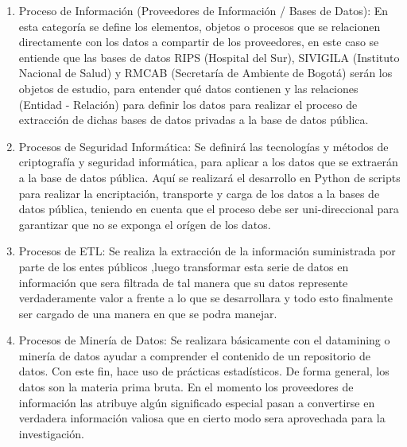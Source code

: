 \documentclass[a4paper, 11pt, oneside]{article}
\theoremstyle{definition}
\theoremstyle{remark}
\begin{document}
\begin{enumerate}[I]
\begin{enumerate}[1.]
\item{Proceso de Información (Proveedores de Información / Bases de Datos): En esta categoría se define los elementos, objetos o procesos que se relacionen directamente con los datos a compartir de los proveedores, en este caso se entiende que las bases de datos RIPS (Hospital del Sur), SIVIGILA (Instituto Nacional de Salud) y RMCAB (Secretaría de Ambiente de Bogotá) serán los objetos de estudio, para entender qué datos contienen y las relaciones (Entidad - Relación) para definir los datos para realizar el proceso de extracción de dichas bases de datos privadas a la base de datos pública.}
\item{Procesos de Seguridad Informática: Se definirá las tecnologías y métodos de criptografía y seguridad informática, para aplicar a los datos que se extraerán a la base de datos pública. Aquí se realizará el desarrollo en Python de scripts para realizar la encriptación, transporte y carga de los datos a la bases de datos pública, teniendo en cuenta que el proceso debe ser uni-direccional para garantizar que no se exponga el orígen de los datos.}
\item{Procesos de ETL: Se realiza la extracción de la información suministrada por parte de los entes públicos ,luego transformar esta serie de datos en información que sera filtrada de tal manera que su datos represente verdaderamente valor a  frente a lo que se desarrollara y todo esto finalmente ser cargado de una manera en que se podra manejar. }
\item{Procesos de Minería de Datos: Se realizara básicamente con el datamining o minería de datos ayudar a comprender el contenido de un repositorio de datos. Con este fin, hace uso de prácticas estadísticos.
De forma general, los datos son la materia prima bruta. En el momento los proveedores de información las atribuye algún significado especial pasan a convertirse en verdadera información valiosa que en cierto modo sera aprovechada para la investigación.}

\end{enumerate}
\end{enumerate}

\clearpage
\end{document}
